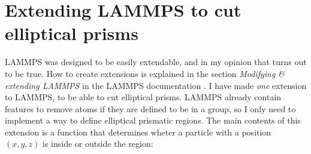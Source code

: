 \section{Extending LAMMPS to cut elliptical prisms}
\label{subsec:reg_eprism}
LAMMPS was designed to be easily extendable, and in my opinion that turns out to be true. How to create extensions is explained in the section \emph{Modifying \& extending LAMMPS} in the LAMMPS documentation \cite{lammps:documentation}. I have made \emph{one} extension to LAMMPS, to be able to cut elliptical prisms. LAMMPS already contain features to remove atoms if they are defined to be in a group, so I only need to implement a way to define elliptical prismatic regions. The main contents of this extension is a function that determines wheter a particle with a position $(x, y, z)$ is inside or outside the region:


